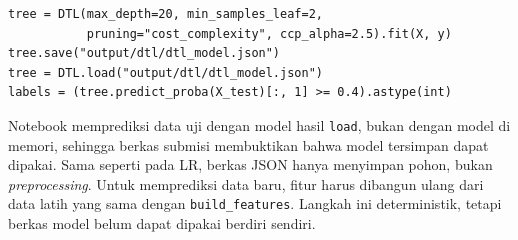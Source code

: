 
\begin{lstlisting}[caption={Contoh penyimpanan dan pemuatan model},label={lst:dtl-usage}]
tree = DTL(max_depth=20, min_samples_leaf=2,
           pruning="cost_complexity", ccp_alpha=2.5).fit(X, y)
tree.save("output/dtl/dtl_model.json")
tree = DTL.load("output/dtl/dtl_model.json")
labels = (tree.predict_proba(X_test)[:, 1] >= 0.4).astype(int)
\end{lstlisting}

Notebook memprediksi data uji dengan model hasil \texttt{load}, bukan dengan model di memori, sehingga
berkas submisi membuktikan bahwa model tersimpan dapat dipakai. Sama seperti pada LR, berkas JSON
hanya menyimpan pohon, bukan \textit{preprocessing}. Untuk memprediksi data baru, fitur harus dibangun
ulang dari data latih yang sama dengan \texttt{build\_features}. Langkah ini deterministik, tetapi
berkas model belum dapat dipakai berdiri sendiri.

